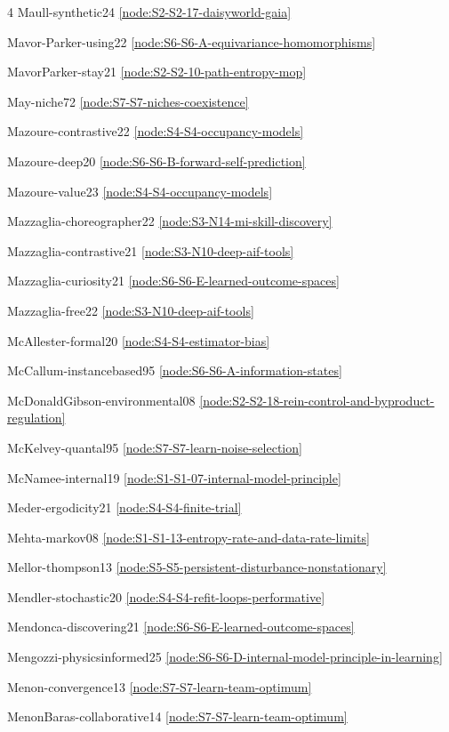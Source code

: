\documentclass[10pt]{article}
\begin{document}
{\begin{multicols}{4}
Maull-synthetic24 \hfill \ref{node:S2-S2-17-daisyworld-gaia}\par
Mavor-Parker-using22 \hfill \ref{node:S6-S6-A-equivariance-homomorphisms}\par
MavorParker-stay21 \hfill \ref{node:S2-S2-10-path-entropy-mop}\par
May-niche72 \hfill \ref{node:S7-S7-niches-coexistence}\par
Mazoure-contrastive22 \hfill \ref{node:S4-S4-occupancy-models}\par
Mazoure-deep20 \hfill \ref{node:S6-S6-B-forward-self-prediction}\par
Mazoure-value23 \hfill \ref{node:S4-S4-occupancy-models}\par
Mazzaglia-choreographer22 \hfill \ref{node:S3-N14-mi-skill-discovery}\par
Mazzaglia-contrastive21 \hfill \ref{node:S3-N10-deep-aif-tools}\par
Mazzaglia-curiosity21 \hfill \ref{node:S6-S6-E-learned-outcome-spaces}\par
Mazzaglia-free22 \hfill \ref{node:S3-N10-deep-aif-tools}\par
McAllester-formal20 \hfill \ref{node:S4-S4-estimator-bias}\par
McCallum-instancebased95 \hfill \ref{node:S6-S6-A-information-states}\par
McDonaldGibson-environmental08 \hfill \ref{node:S2-S2-18-rein-control-and-byproduct-regulation}\par
McKelvey-quantal95 \hfill \ref{node:S7-S7-learn-noise-selection}\par
McNamee-internal19 \hfill \ref{node:S1-S1-07-internal-model-principle}\par
Meder-ergodicity21 \hfill \ref{node:S4-S4-finite-trial}\par
Mehta-markov08 \hfill \ref{node:S1-S1-13-entropy-rate-and-data-rate-limits}\par
Mellor-thompson13 \hfill \ref{node:S5-S5-persistent-disturbance-nonstationary}\par
Mendler-stochastic20 \hfill \ref{node:S4-S4-refit-loops-performative}\par
Mendonca-discovering21 \hfill \ref{node:S6-S6-E-learned-outcome-spaces}\par
Mengozzi-physicsinformed25 \hfill \ref{node:S6-S6-D-internal-model-principle-in-learning}\par
Menon-convergence13 \hfill \ref{node:S7-S7-learn-team-optimum}\par
MenonBaras-collaborative14 \hfill \ref{node:S7-S7-learn-team-optimum}\par

\end{multicols}}
\end{document}
